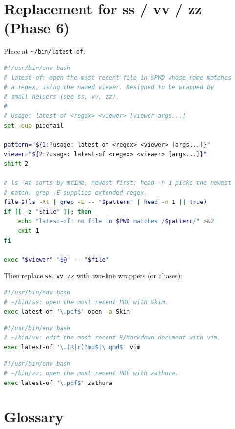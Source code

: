 \documentclass[11pt,letterpaper]{scrartcl}
\begin{document}
\section{Replacement for ss / vv / zz (Phase 6)}

Place at \texttt{\textasciitilde/bin/latest-of}:

\begin{lstlisting}[language=bash]
#!/usr/bin/env bash
# latest-of: open the most recent file in $PWD whose name matches
# a regex, using the named viewer. Designed to be wrapped by
# small helpers (see ss, vv, zz).
#
# Usage: latest-of <regex> <viewer> [viewer-args...]
set -euo pipefail

pattern="${1:?usage: latest-of <regex> <viewer> [args...]}"
viewer="${2:?usage: latest-of <regex> <viewer> [args...]}"
shift 2

# ls -At sorts by mtime, newest first; head -n 1 picks the newest
# match. grep -E supplies extended regex.
file=$(ls -At | grep -E -- "$pattern" | head -n 1 || true)
if [[ -z "$file" ]]; then
    echo "latest-of: no file in $PWD matches /$pattern/" >&2
    exit 1
fi

exec "$viewer" "$@" -- "$file"
\end{lstlisting}

Then replace \texttt{ss}, \texttt{vv}, \texttt{zz} with two-line
wrappers (or aliases):

\begin{lstlisting}[language=bash]
#!/usr/bin/env bash
# ~/bin/ss: open the most recent PDF with Skim.
exec latest-of '\.pdf$' open -a Skim
\end{lstlisting}

\begin{lstlisting}[language=bash]
#!/usr/bin/env bash
# ~/bin/vv: edit the most recent R/Markdown document with vim.
exec latest-of '\.(R|r)?md$|\.qmd$' vim
\end{lstlisting}

\begin{lstlisting}[language=bash]
#!/usr/bin/env bash
# ~/bin/zz: open the most recent PDF with zathura.
exec latest-of '\.pdf$' zathura
\end{lstlisting}

\section{Glossary}
\end{document}
